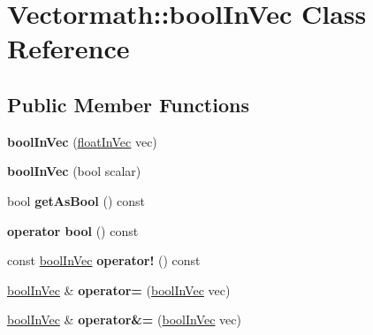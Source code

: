\hypertarget{classVectormath_1_1boolInVec}{}\section{Vectormath\+:\+:bool\+In\+Vec Class Reference}
\label{classVectormath_1_1boolInVec}
\subsection*{Public Member Functions}
\begin{DoxyCompactItemize}
\item 
\mbox{\label{classVectormath_1_1boolInVec_aa21ebe5fd4b82622482071def03bf027}} 
{\bfseries bool\+In\+Vec} (\hyperlink{classVectormath_1_1floatInVec}{float\+In\+Vec} vec)
\item 
\mbox{\label{classVectormath_1_1boolInVec_a4f28ddfcc232b287446eb659b2c5f326}} 
{\bfseries bool\+In\+Vec} (bool scalar)
\item 
\mbox{\label{classVectormath_1_1boolInVec_a6028226a95d3de1414a6b6208b8e2620}} 
bool {\bfseries get\+As\+Bool} () const
\item 
\mbox{\label{classVectormath_1_1boolInVec_ad01f012cf3120f06674a8f8a1112ab35}} 
{\bfseries operator bool} () const
\item 
\mbox{\label{classVectormath_1_1boolInVec_a94731dbf8e8076d94e9ee00e395903ca}} 
const \hyperlink{classVectormath_1_1boolInVec}{bool\+In\+Vec} {\bfseries operator!} () const
\item 
\mbox{\label{classVectormath_1_1boolInVec_a2c50cda65cc64eb8a72ccab7fc4ad88d}} 
\hyperlink{classVectormath_1_1boolInVec}{bool\+In\+Vec} \& {\bfseries operator=} (\hyperlink{classVectormath_1_1boolInVec}{bool\+In\+Vec} vec)
\item 
\mbox{\label{classVectormath_1_1boolInVec_a8f0c0938b3beb64e5aaa0bfd5c561368}} 
\hyperlink{classVectormath_1_1boolInVec}{bool\+In\+Vec} \& {\bfseries operator\&=} (\hyperlink{classVectormath_1_1boolInVec}{bool\+In\+Vec} vec)

\end{DoxyCompactItemize}

